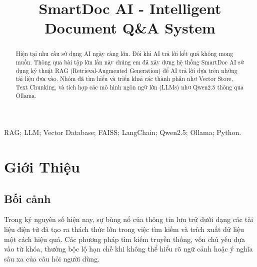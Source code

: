 \documentclass[conference]{IEEEtran}
\begin{document}
\title{SmartDoc AI - Intelligent Document \texorpdfstring{Q\&A}{Q&A} System}

\author{
}

\maketitle

\begin{abstract}
Hiện tại nhu cầu sử dụng AI ngày càng lớn. Đôi khi AI trả lời kết quả không mong muốn. Thông qua bài tập lớn lần này chúng em đã xây dựng hệ thống SmartDoc AI sử dụng kỹ thuật RAG (Retrieval-Augmented Generation) để AI trả lời dựa trên những tài liệu đưa vào. Nhóm đã tìm hiểu và triển khai các thành phần như Vector Store, Text Chunking, và tích hợp các mô hình ngôn ngữ lớn (LLMs) như Qwen2.5 thông qua Ollama.
\end{abstract}

\begin{IEEEkeywords}
RAG; LLM; Vector Database; FAISS; LangChain; Qwen2.5; Ollama; Python.
\end{IEEEkeywords}

\section{Giới Thiệu}

\subsection{Bối cảnh}

Trong kỷ nguyên số hiện nay, sự bùng nổ của thông tin lưu trữ dưới dạng các tài liệu điện tử đã tạo ra thách thức lớn trong việc tìm kiếm và trích xuất dữ liệu một cách hiệu quả. Các phương pháp tìm kiếm truyền thống, vốn chủ yếu dựa vào từ khóa, thường bộc lộ hạn chế khi không thể hiểu rõ ngữ cảnh hoặc ý nghĩa sâu xa của câu hỏi người dùng.
\end{document}
